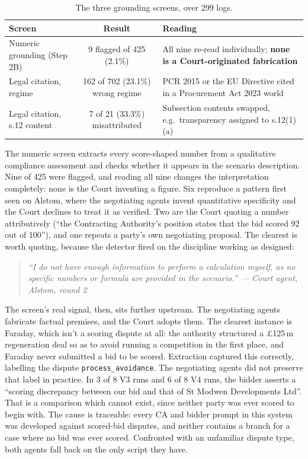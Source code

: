 \begin{table}[htbp]
\centering
\footnotesize
\caption[Fabrication screens]{The three grounding screens, over 299 logs.}
\label{tab:fabrication}
\begin{tabular}{|l|c|p{6.2cm}|}
\hline
\textbf{Screen} & \textbf{Result} & \textbf{Reading} \\
\hline
Numeric grounding (Step 2B) & 9 flagged of 425 (2.1\%) &
 All nine re-read individually; \textbf{none is a Court-originated fabrication} \\
\hline
Legal citation, regime & 162 of 702 (23.1\%) wrong regime &
 PCR 2015 or the EU Directive cited in a Procurement Act 2023 world \\
\hline
Legal citation, s.12 content & 7 of 21 (33.3\%) misattributed &
 Subsection contents swapped, e.g.\ transparency assigned to s.12(1)(a) \\
\hline
\end{tabular}
\end{table}

The numeric screen extracts every score-shaped number from a qualitative
compliance assessment and checks whether it appears in the scenario description.
Nine of 425 were flagged, and reading all nine changes the interpretation
completely: none is the Court inventing a figure. Six reproduce a pattern first
seen on Alstom, where the negotiating agents invent quantitative specificity and
the Court declines to treat it as verified. Two are the Court quoting a number
attributively (``the Contracting Authority's position states that the bid scored
92 out of 100''), and one repeats a party's own negotiating proposal. The clearest
is worth quoting, because the detector fired on the discipline working as
designed:

\begin{quote}\itshape\small
``I do not have enough information to perform a calculation myself, as no specific
numbers or formula are provided in the scenario.''
\hfill --- Court agent, Alstom, round 2
\end{quote}

The screen's real signal, then, sits further upstream. The negotiating agents
fabricate factual premises, and the Court adopts them. The clearest
instance is Faraday, which isn't a scoring dispute at all: the authority
structured a \pounds125\,m regeneration deal so as to avoid running a
competition in the first place, and Faraday never submitted a bid to be scored.
Extraction captured this correctly, labelling the dispute
\texttt{process\_avoidance}. The negotiating agents did not preserve that label
in practice. In 3 of 8 V3 runs and 6 of 8 V4 runs, the bidder asserts a
``scoring discrepancy between our bid and that of St Modwen Developments Ltd''.
That is a comparison which cannot exist, since neither party was ever scored to
begin with. The cause is traceable: every CA and bidder prompt in this system was
developed against scored-bid disputes, and neither contains a branch for a case
where no bid was ever scored. Confronted with an unfamiliar dispute type,
both agents fall back on the only script they have.

